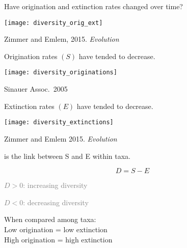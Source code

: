 \documentclass[t]{beamer}
\newcommand{\backskip}{\vspace{-0.5\baselineskip}}
\begin{document}

\begin{frame}{Have origination and extinction rates changed over time?}

\backskip

\texttt{[image: diversity\_orig\_ext]}
	
\tinyfill \textcopyright Zimmer and Emlem, 2015. \textit{Evolution}

\end{frame}




\begin{frame}{Origination rates $\left(S\right)$ have tended to decrease.}

\backskip

\centering

\texttt{[image: diversity\_originations]}
	
\tinyfill \textcopyright Sinauer Assoc.~2005

\end{frame}


\begin{frame}{Extinction rates $\left(E\right)$ have tended to decrease.}

\backskip

\centering

\texttt{[image: diversity\_extinctions]}

\tinyfill \textcopyright Zimmer and Emlem 2015. \textit{Evolution}

\end{frame}

%

\begin{frame}{ is the link between S and E within taxa.}

\backskip

\begin{multicols}{2}
{\Large
\begin{equation*}
D = S - E
\end{equation*}
}%

\columnbreak

\hangpara \textcolor{gray}{$D > 0$: increasing diversity}

\hangpara \textcolor{gray}{$D < 0$: decreasing diversity}

\end{multicols}

\hangpara When compared among taxa:
\\
\hspace*{1em} Low origination = low extinction
\\
\hspace*{1em} High origination = high extinction

\end{frame}
\end{document}
